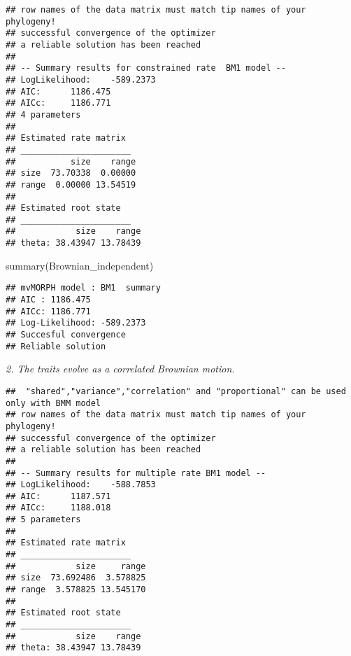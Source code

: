 \documentclass[
]{article}
\newenvironment{Shaded}{\begin{snugshade}}{\end{snugshade}}
\newcommand{\AttributeTok}[1]{\textcolor[rgb]{0.77,0.63,0.00}{#1}}
\newcommand{\CommentTok}[1]{\textcolor[rgb]{0.56,0.35,0.01}{\textit{#1}}}
\newcommand{\FunctionTok}[1]{\textcolor[rgb]{0.00,0.00,0.00}{#1}}
\newcommand{\NormalTok}[1]{#1}
\newcommand{\OtherTok}[1]{\textcolor[rgb]{0.56,0.35,0.01}{#1}}
\newcommand{\SpecialCharTok}[1]{\textcolor[rgb]{0.00,0.00,0.00}{#1}}
\newcommand{\StringTok}[1]{\textcolor[rgb]{0.31,0.60,0.02}{#1}}
\begin{document}
\begin{verbatim}
## row names of the data matrix must match tip names of your phylogeny! 
## successful convergence of the optimizer 
## a reliable solution has been reached 
## 
## -- Summary results for constrained rate  BM1 model -- 
## LogLikelihood:    -589.2373 
## AIC:      1186.475 
## AICc:     1186.771 
## 4 parameters 
## 
## Estimated rate matrix 
## ______________________ 
##           size    range
## size  73.70338  0.00000
## range  0.00000 13.54519
## 
## Estimated root state 
## ______________________ 
##            size    range
## theta: 38.43947 13.78439
\end{verbatim}

\begin{Shaded}
\begin{Highlighting}[]
\FunctionTok{summary}\NormalTok{(Brownian\_independent)}
\end{Highlighting}
\end{Shaded}

\begin{verbatim}
## mvMORPH model : BM1  summary 
## AIC : 1186.475 
## AICc: 1186.771 
## Log-Likelihood: -589.2373 
## Succesful convergence 
## Reliable solution
\end{verbatim}

\emph{2. The traits evolve as a correlated Brownian motion.}

\begin{Shaded}
\end{Shaded}

\begin{verbatim}
##  "shared","variance","correlation" and "proportional" can be used only with BMM model 
## row names of the data matrix must match tip names of your phylogeny! 
## successful convergence of the optimizer 
## a reliable solution has been reached 
## 
## -- Summary results for multiple rate BM1 model -- 
## LogLikelihood:    -588.7853 
## AIC:      1187.571 
## AICc:     1188.018 
## 5 parameters 
## 
## Estimated rate matrix 
## ______________________ 
##            size     range
## size  73.692486  3.578825
## range  3.578825 13.545170
## 
## Estimated root state 
## ______________________ 
##            size    range
## theta: 38.43947 13.78439
\end{verbatim}
\end{document}
